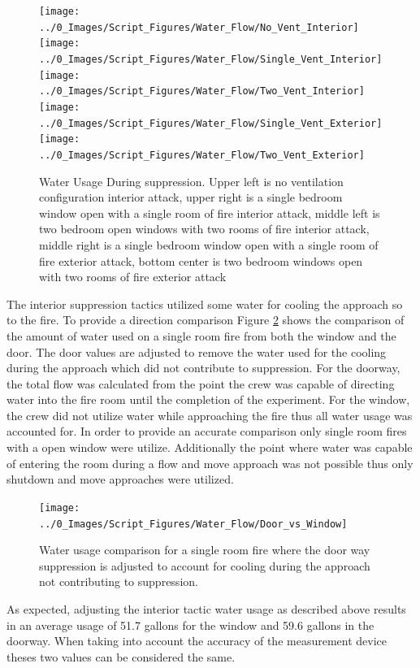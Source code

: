 \documentclass[12pt,oneside]{book}
\begin{document}
\begin{figure}[H]
\centering
\texttt{[image: ../0\_Images/Script\_Figures/Water\_Flow/No\_Vent\_Interior]}
\texttt{[image: ../0\_Images/Script\_Figures/Water\_Flow/Single\_Vent\_Interior]}
\texttt{[image: ../0\_Images/Script\_Figures/Water\_Flow/Two\_Vent\_Interior]}
\texttt{[image: ../0\_Images/Script\_Figures/Water\_Flow/Single\_Vent\_Exterior]}
\texttt{[image: ../0\_Images/Script\_Figures/Water\_Flow/Two\_Vent\_Exterior]}
\caption[Water Usage vs. Ventilation]{Water Usage During suppression. Upper left is no ventilation configuration interior attack, upper right is a single bedroom window open with a single room of fire interior attack, middle left is two bedroom open windows with two rooms of fire interior attack, middle right is a single bedroom window open with a single room of fire exterior attack, bottom center is two bedroom windows open with two rooms of fire exterior attack}
\label{fig:water_flow_vent_compare}
\end{figure}

The interior suppression tactics utilized some water for cooling the approach so to the fire. To provide a direction comparison Figure \ref{fig:Door_vs_window} shows the comparison of the amount of water used on a single room fire from both the window and the door. The door values are adjusted to remove the water used for the cooling during the approach which did not contribute to suppression. For the doorway, the total flow was calculated from the point the crew was capable of directing water into the fire room until the completion of the experiment. For the window, the crew did not utilize water while approaching the fire thus all water usage was accounted for. In order to provide an accurate comparison only single room fires with a open window were utilize. Additionally the point where water was capable of entering the room during a flow and move approach was not possible thus only shutdown and move approaches were utilized.

\begin{figure}[H]
\centering
\texttt{[image: ../0\_Images/Script\_Figures/Water\_Flow/Door\_vs\_Window]}
\caption[Water Usage For Single Room]{Water usage comparison for a single room fire where the door way suppression is adjusted to account for cooling during the approach not contributing to suppression.}
\label{fig:Door_vs_window}
\end{figure}

As expected, adjusting the interior tactic water usage as described above results in an average usage of 51.7 gallons for the window and 59.6 gallons in the doorway. When taking into account the accuracy of the measurement device theses two values can be considered the same.  
\end{document}
